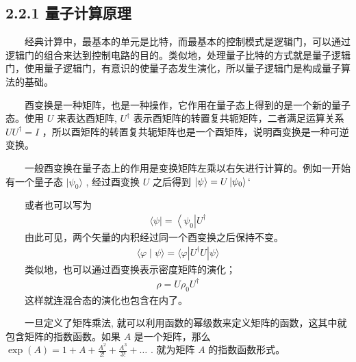 \documentclass[a4paper,11pt,english]{sphinxmanual}
\begin{document}
\subsection{2.2.1 量子计算原理}
\label{\detokenize{rst/2.2_u91cf_u5b50_u7a0b_u5e8f:id2}}
\sphinxAtStartPar
  经典计算中，最基本的单元是比特，而最基本的控制模式是逻辑门，可以通过逻辑门的组合来达到控制电路的目的。类似地，处理量子比特的方式就是量子逻辑门，使用量子逻辑门，有意识的使量子态发生演化，所以量子逻辑门是构成量子算法的基础。

\sphinxAtStartPar
{}

\sphinxAtStartPar
  酉变换是一种矩阵，也是一种操作，它作用在量子态上得到的是一个新的量子态。使用  \(U\) 来表达酉矩阵,  \(U^{\dagger}\) 表示酉矩阵的转置复共轭矩阵，二者满足运算关系  \(UU^{\dagger}=I\) ，所以酉矩阵的转置复共轭矩阵也是一个酉矩阵，说明酉变换是一种可逆变换。

\sphinxAtStartPar
  一般酉变换在量子态上的作用是变换矩阵左乘以右矢进行计算的。例如一开始有一个量子态  \(|\psi_{0}\rangle\) , 经过酉变换  \(U\) 之后得到  \(|\psi\rangle=U\left|\psi_{0}\right\rangle`\)

\sphinxAtStartPar
  或者也可以写为
\begin{equation*}
\begin{split}\langle\psi|=\left\langle\psi_{0}\right| U^{\dagger}\end{split}
\end{equation*}
\sphinxAtStartPar
  由此可见，两个矢量的内积经过同一个酉变换之后保持不变。
\begin{equation*}
\begin{split}\langle\varphi \mid \psi\rangle=\langle\varphi|U^{\dagger}U| \psi\rangle\end{split}
\end{equation*}
\sphinxAtStartPar
  类似地，也可以通过酉变换表示密度矩阵的演化；
\begin{equation*}
\begin{split}\rho=U{\rho_{0}} U^{\dagger}\end{split}
\end{equation*}
\sphinxAtStartPar
  这样就连混合态的演化也包含在内了。

\sphinxAtStartPar
{}

\sphinxAtStartPar
  一旦定义了矩阵乘法, 就可以利用函数的幂级数来定义矩阵的函数，这其中就包含矩阵的指数函数。如果 \(A\) 是一个矩阵，那么 \(\exp (A)=1+A+\frac{A^{2}}{2 !}+\frac{A^{3}}{3 !}+\ldots\) . 就为矩阵  \(A\) 的指数函数形式。
\end{document}
